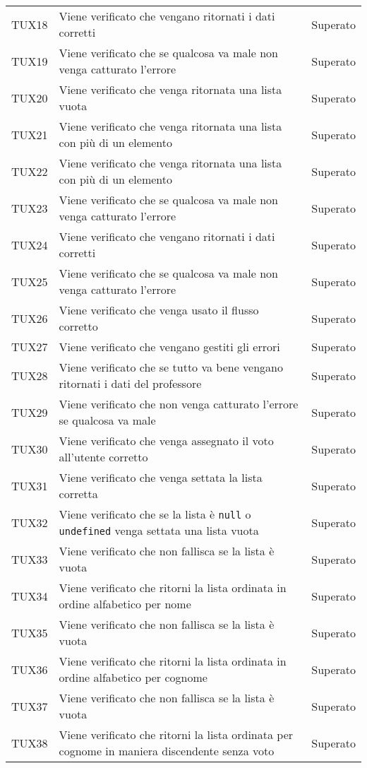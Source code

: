 \documentclass[PianoDiQualifica.tex]{subfiles}
\begin{document}
\begin{longtable}[H]{P{2cm}P{8.5cm}P{3cm}}
	TUX18 & Viene verificato che vengano ritornati i dati corretti & Superato \\
	TUX19 & Viene verificato che se qualcosa va male non venga catturato l'errore & Superato \\
	TUX20 & Viene verificato che venga ritornata una lista vuota & Superato \\
	TUX21 & Viene verificato che venga ritornata una lista con più di un elemento & Superato \\
	TUX22 & Viene verificato che venga ritornata una lista con più di un elemento & Superato \\
	TUX23 & Viene verificato che se qualcosa va male non venga catturato l'errore & Superato \\
	TUX24 & Viene verificato che vengano ritornati i dati corretti & Superato \\
	TUX25 & Viene verificato che se qualcosa va male non venga catturato l'errore & Superato \\
	TUX26 & Viene verificato che venga usato il flusso corretto & Superato \\
	TUX27 & Viene verificato che vengano gestiti gli errori & Superato \\
	TUX28 & Viene verificato che se tutto va bene vengano ritornati i dati del professore & Superato \\
	TUX29 & Viene verificato che non venga catturato l'errore se qualcosa va male & Superato \\
	TUX30 & Viene verificato che venga assegnato il voto all'utente corretto & Superato \\
	TUX31 & Viene verificato che venga settata la lista corretta & Superato \\
	TUX32 & Viene verificato che se la lista è \texttt{null} o \texttt{undefined} venga settata una lista vuota & Superato \\
	TUX33 & Viene verificato che non fallisca se la lista è vuota & Superato \\
	TUX34 & Viene verificato che ritorni la lista ordinata in ordine alfabetico per nome & Superato \\
	TUX35 & Viene verificato che non fallisca se la lista è vuota & Superato \\
	TUX36 & Viene verificato che ritorni la lista ordinata in ordine alfabetico per cognome & Superato \\
	TUX37 & Viene verificato che non fallisca se la lista è vuota & Superato \\
	TUX38 & Viene verificato che ritorni la lista ordinata per cognome in maniera discendente senza voto & Superato \\

\end{longtable}
\end{document}

